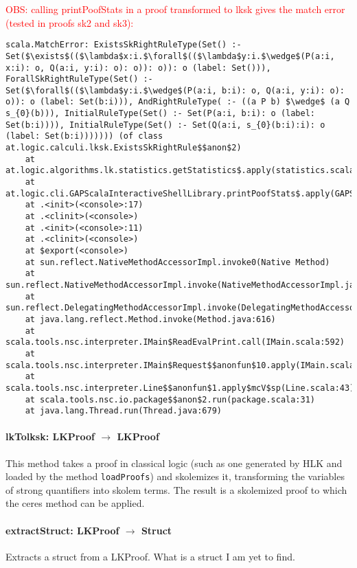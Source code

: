 \documentclass[a4paper, 11pt]{article}
\begin{document}
\textcolor{red}{OBS: calling printPoofStats in a proof transformed to lksk gives the match error (tested in proofs sk2 and sk3):}
\begin{lstlisting}
scala.MatchError: ExistsSkRightRuleType(Set() :- Set($\exists$(($\lambda$x:i.$\forall$(($\lambda$y:i.$\wedge$(P(a:i, x:i): o, Q(a:i, y:i): o): o)): o)): o (label: Set())), ForallSkRightRuleType(Set() :- Set($\forall$(($\lambda$y:i.$\wedge$(P(a:i, b:i): o, Q(a:i, y:i): o): o)): o (label: Set(b:i))), AndRightRuleType( :- ((a P b) $\wedge$ (a Q s_{0}(b))), InitialRuleType(Set() :- Set(P(a:i, b:i): o (label: Set(b:i)))), InitialRuleType(Set() :- Set(Q(a:i, s_{0}(b:i):i): o (label: Set(b:i))))))) (of class at.logic.calculi.lksk.ExistsSkRightRule$$anon$2)
	at at.logic.algorithms.lk.statistics.getStatistics$.apply(statistics.scala:31)
	at at.logic.cli.GAPScalaInteractiveShellLibrary.printPoofStats$.apply(GAPScalaInteractiveShellLibrary.scala:70)
	at .<init>(<console>:17)
	at .<clinit>(<console>)
	at .<init>(<console>:11)
	at .<clinit>(<console>)
	at $export(<console>)
	at sun.reflect.NativeMethodAccessorImpl.invoke0(Native Method)
	at sun.reflect.NativeMethodAccessorImpl.invoke(NativeMethodAccessorImpl.java:57)
	at sun.reflect.DelegatingMethodAccessorImpl.invoke(DelegatingMethodAccessorImpl.java:43)
	at java.lang.reflect.Method.invoke(Method.java:616)
	at scala.tools.nsc.interpreter.IMain$ReadEvalPrint.call(IMain.scala:592)
	at scala.tools.nsc.interpreter.IMain$Request$$anonfun$10.apply(IMain.scala:828)
	at scala.tools.nsc.interpreter.Line$$anonfun$1.apply$mcV$sp(Line.scala:43)
	at scala.tools.nsc.io.package$$anon$2.run(package.scala:31)
	at java.lang.Thread.run(Thread.java:679)
\end{lstlisting}

\paragraph{\textbf{lkTolksk: LKProof $\rightarrow$ LKProof}}
This method takes a proof in classical logic (such as one generated by HLK and 
loaded by the method \texttt{loadProofs}) and skolemizes it, transforming the 
variables of strong quantifiers into skolem terms. The result is a skolemized 
proof to which the ceres method can be applied.

\paragraph{\textbf{extractStruct: LKProof $\rightarrow$ Struct}}
Extracts a struct from a LKProof. What is a struct I am yet to find.
\end{document}
